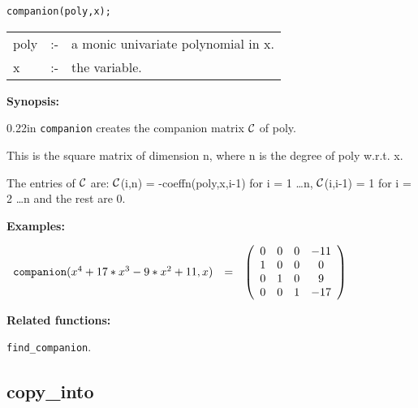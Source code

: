 
\hspace*{0.175in} {\tt companion(poly,x);}

\hspace*{0.1in} 
\begin{tabular}{l l l}
poly &:-& a monic univariate polynomial in x. \\
x    &:-& the variable.
\end{tabular}

{\bf Synopsis:} %


\begin{addtolength}{\leftskip}{0.22in}
                {\tt companion} creates the companion matrix ${\cal C}$
                of poly. 

This is the square matrix of dimension n, where n is the degree of poly 
w.r.t. x.

The entries of ${\cal C}$ are: 
                ${\cal C}$(i,n) = -coeffn(poly,x,i-1) for i = 1 
                \ldots n, ${\cal C}$(i,i-1) = 1 for i = 2 \ldots n and 
                the rest are 0.

\end{addtolength}


{\bf Examples:}

\begin{flushleft}  
\hspace*{0.1in}
\begin{math}  
\begin{array}{ccc}
{\tt companion}(x^4+17*x^3-9*x^2+11,x) & = & 
\left( \begin{array}{cccc} 0 & 0 & 0 & -11 \\ 1 & 0 & 0 & 0 \\ 
0 & 1 & 0 & 9 \\ 0 & 0 & 1 & -17 
\end{array} \right)
\end{array}
\end{math}  
\end{flushleft}

{\bf Related functions:}

\hspace*{0.175in} {\tt find\_companion}.


\subsection{copy\_into}



